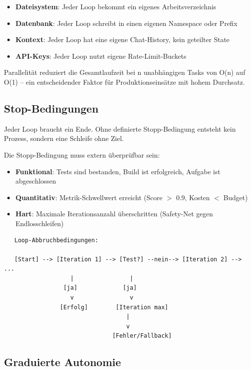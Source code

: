 \begin{itemize}[leftmargin=*]
    \item \textbf{Dateisystem}: Jeder Loop bekommt ein eigenes Arbeitsverzeichnis
    \item \textbf{Datenbank}: Jeder Loop schreibt in einen eigenen Namespace oder Prefix
    \item \textbf{Kontext}: Jeder Loop hat eine eigene Chat-History, kein geteilter State
    \item \textbf{API-Keys}: Jeder Loop nutzt eigene Rate-Limit-Buckets
\end{itemize}

Parallelität reduziert die Gesamtlaufzeit bei n unabhängigen Tasks von O(n) auf O(1) -- ein entscheidender Faktor für Produktionseinsätze mit hohem Durchsatz.

\subsection{Stop-Bedingungen}

Jeder Loop braucht ein Ende. Ohne definierte Stopp-Bedingung entsteht kein Prozess, sondern eine Schleife ohne Ziel.

Die Stopp-Bedingung muss extern überprüfbar sein:

\begin{itemize}[leftmargin=*]
    \item \textbf{Funktional}: Tests sind bestanden, Build ist erfolgreich, Aufgabe ist abgeschlossen
    \item \textbf{Quantitativ}: Metrik-Schwellwert erreicht (Score $>$ 0.9, Kosten $<$ Budget)
    \item \textbf{Hart}: Maximale Iterationsanzahl überschritten (Safety-Net gegen Endlosschleifen)
\end{itemize}

\begin{verbatim}
   Loop-Abbruchbedingungen:

   [Start] --> [Iteration 1] --> [Test?] --nein--> [Iteration 2] --> ...
                   |                |
                 [ja]             [ja]
                   v                v
                [Erfolg]        [Iteration max]
                                   |
                                   v
                               [Fehler/Fallback]
\end{verbatim}

\subsection{Graduierte Autonomie}


